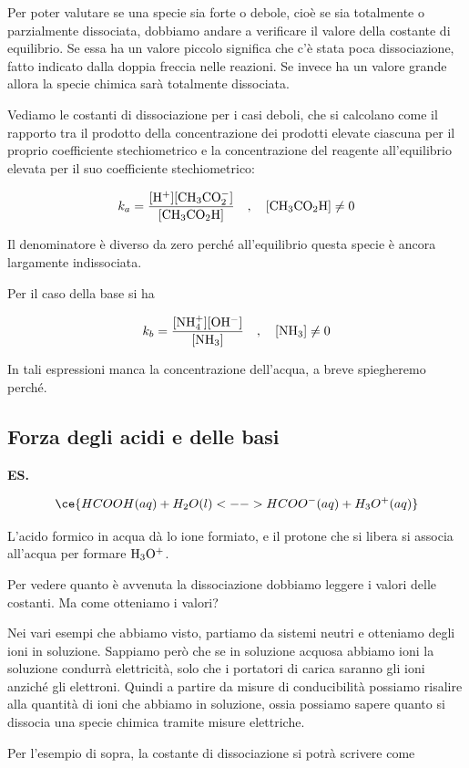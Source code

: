 Per poter valutare se una specie sia forte o debole, cioè se sia totalmente o parzialmente dissociata, dobbiamo andare a verificare il valore della costante di equilibrio. Se essa ha un valore piccolo significa che c'è stata poca dissociazione, fatto indicato dalla doppia freccia nelle reazioni. Se invece ha un valore grande allora la specie chimica sarà totalmente dissociata.

\vspace{0.2cm}Vediamo le costanti di dissociazione per i casi deboli, che si calcolano come il rapporto tra il prodotto della concentrazione dei prodotti elevate ciascuna per il proprio coefficiente stechiometrico e la concentrazione del reagente all'equilibrio elevata per il suo coefficiente stechiometrico:

$$k_a=\rm{\frac{[H^+][CH_3CO_2^-]}{[CH_3CO_2H]}}
\quad,\quad
[CH_3CO_2H] \neq 0$$

Il denominatore è diverso da zero perché all'equilibrio questa specie è ancora largamente indissociata.

Per il caso della base si ha

$$k_b=\rm{\frac{[NH_4^+][OH^-]}{[NH_3]}}
\quad,\quad
[NH_3] \neq 0$$

In tali espressioni manca la concentrazione dell'acqua, a breve spiegheremo perché.
\subsection{Forza degli acidi e delle basi}
\textbf{ES.}

$$\ce{HCOOH(aq) + H_2O(l) <--> HCOO^-(aq) + H_3O^+(aq)}$$

L'acido formico in acqua dà lo ione formiato, e il protone che si libera si associa all'acqua per formare $\rm H_3O^+$.

Per vedere quanto è avvenuta la dissociazione dobbiamo leggere i valori delle costanti. Ma come otteniamo i valori?

Nei vari esempi che abbiamo visto, partiamo da sistemi neutri e otteniamo degli ioni in soluzione. Sappiamo però che se in soluzione acquosa abbiamo ioni la soluzione condurrà elettricità, solo che i portatori di carica saranno gli ioni anziché gli elettroni. Quindi a partire da misure di conducibilità possiamo risalire alla quantità di ioni che abbiamo in soluzione, ossia possiamo sapere quanto si dissocia una specie chimica tramite misure elettriche.

Per l'esempio di sopra, la costante di dissociazione si potrà scrivere come

